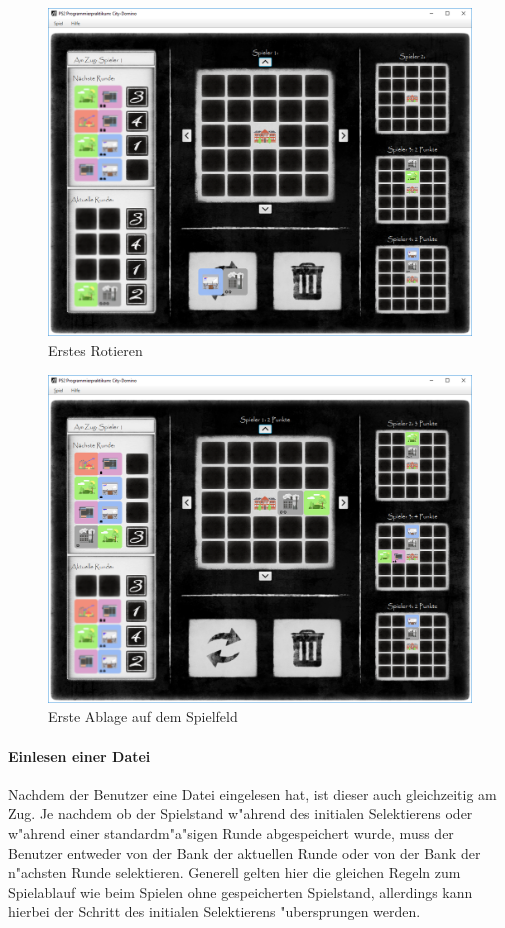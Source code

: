\begin{figure}
	\centering
	\includegraphics{screenshots/screenshot_ErstesRotieren.png}
	\caption{Erstes Rotieren}
	\label{fig:erstesRotieren}
\end{figure}

\begin{figure}
	\centering
	\includegraphics{screenshots/screenshot_ErsteAblage.png}
	\caption[Erste Ablage]{Erste Ablage auf dem Spielfeld}
	\label{fig:ersteAblage}
\end{figure}

\paragraph{Einlesen einer Datei}
Nachdem der Benutzer eine Datei eingelesen hat, ist dieser auch gleichzeitig am Zug. Je nachdem ob der Spielstand w"ahrend des initialen Selektierens oder w"ahrend einer standardm"a"sigen Runde abgespeichert wurde, muss der Benutzer entweder von der Bank der aktuellen Runde oder von der Bank der n"achsten Runde selektieren. Generell gelten hier die gleichen Regeln zum Spielablauf wie beim Spielen ohne gespeicherten Spielstand, allerdings kann hierbei der Schritt des initialen Selektierens "ubersprungen werden. 

